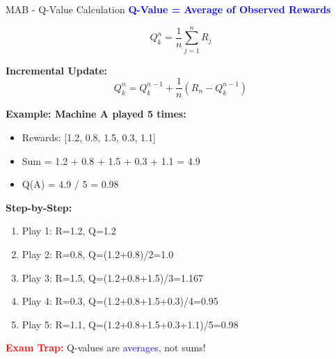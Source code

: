 \documentclass[8pt]{beamer}
\begin{document}
\begin{frame}{MAB - Q-Value Calculation}
\fontsize{6.5}{7.5}\selectfont
\textcolor{blue}{\textbf{Q-Value = Average of Observed Rewards}}

\[
Q_k^n = \frac{1}{n}\sum_{j=1}^n R_j
\]

\textbf{Incremental Update:}
\[
Q_k^n = Q_k^{n-1} + \frac{1}{n}(R_n - Q_k^{n-1})
\]

\textbf{Example: Machine A played 5 times:}
\begin{itemize}
\item Rewards: [1.2, 0.8, 1.5, 0.3, 1.1]
\item Sum = 1.2 + 0.8 + 1.5 + 0.3 + 1.1 = 4.9
\item Q(A) = 4.9 / 5 = 0.98
\end{itemize}

\textbf{Step-by-Step:}
\begin{enumerate}
\item Play 1: R=1.2, Q=1.2
\item Play 2: R=0.8, Q=(1.2+0.8)/2=1.0
\item Play 3: R=1.5, Q=(1.2+0.8+1.5)/3=1.167
\item Play 4: R=0.3, Q=(1.2+0.8+1.5+0.3)/4=0.95
\item Play 5: R=1.1, Q=(1.2+0.8+1.5+0.3+1.1)/5=0.98
\end{enumerate}

\textcolor{red}{\textbf{Exam Trap:}} Q-values are \textcolor{blue}{averages}, not sums!
\end{frame}
\end{document}
